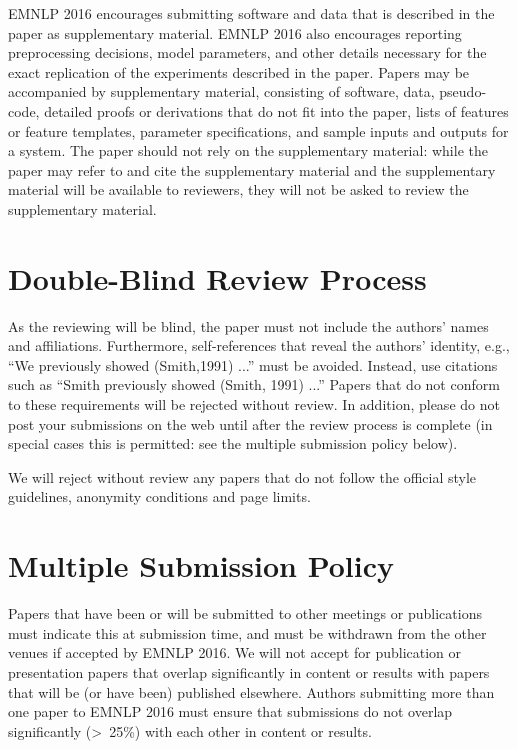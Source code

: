 \documentclass[11pt,letterpaper]{article}
\begin{document}
EMNLP 2016 encourages submitting software and data that is described in the
paper as supplementary material. EMNLP 2016 also encourages reporting
preprocessing decisions, model parameters, and other details necessary for the
exact replication of the experiments described in the paper. Papers may be
accompanied by supplementary material, consisting of software, data, pseudo-code,
detailed proofs or derivations that do not fit into the paper, lists of features
or feature templates, parameter specifications, and sample inputs and outputs
for a system. The paper should not rely on the supplementary material: while the
paper may refer to and cite the supplementary material and the supplementary
material will be available to reviewers, they will not be asked to review the
supplementary material.

\section{Double-Blind Review Process}
\label{sec:blind}

As the reviewing will be blind, the paper must not include the authors' names and
affiliations.  Furthermore, self-references that reveal the authors' identity,
e.g., ``We previously showed (Smith,1991) ...'' must be avoided. Instead, use
citations such as ``Smith previously showed (Smith, 1991) ...'' Papers that do
not conform to these requirements will be rejected without review. In addition,
please do not post your submissions on the web until after the review process is
complete (in special cases this is permitted: see the multiple submission policy
below).

We will reject without review any papers that do not follow the official style
guidelines, anonymity conditions and page limits.

\section{Multiple Submission Policy}

Papers that have been or will be submitted to other meetings or publications must
indicate this at submission time, and must be withdrawn from the other venues if
accepted by EMNLP 2016. We will not accept for publication or presentation papers
that overlap significantly in content or results with papers that will be (or
have been) published elsewhere. Authors submitting more than one paper to EMNLP
2016 must ensure that submissions do not overlap significantly (\textgreater~25\%) with
each other in content or results.
\end{document}
